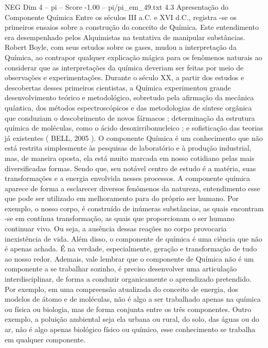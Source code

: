 \begin{textsample}{NEG Dim 4 – pi – Score -1.00 – pi/pi\_em\_49.txt}  \label{ex:f4_neg_166}
4.3 Apresentação do Componente Química Entre os séculos III a.C. e XVI d.C., registra -se os primeiros ensaios sobre a construção do conceito de Química.
Este entendimento era desempenhado pelos Alquimistas na tentativa de manipular substâncias.
Robert Boyle, com seus estudos sobre os gases, mudou a interpretação da Química, ao contrapor qualquer explicação mágica para os fenômenos naturais ao considerar que as interpretações da química deveriam ser feitas por meio de observações e experimentações.
Durante o século XX, a partir dos estudos e descobertas desses primeiros cientistas, a Química experimentou grande desenvolvimento teórico e metodológico, sobretudo pela afirmação da mecânica quântica, dos métodos espectroscópicos e das metodologias de síntese orgânica que conduziam o descobrimento de novos fármacos ; determinação da estrutura química de moléculas, como o ácido desoxirribonucleico ; e sofisticação das teorias já existentes ( BELL, 2005 ).
O componente Química é um conhecimento que não está restrita simplesmente às pesquisas de laboratório e à produção industrial, mas, de maneira oposta, ela está muito marcada em nosso cotidiano pelas mais diversificadas formas.
Sendo que, seu notável centro de estudo é a matéria, suas transformações e a energia envolvida nesses processos.
A componente química aparece de forma a esclarecer diversos fenômenos da natureza, entendimento esse que pode ser utilizado em melhoramento para do próprio ser humano.
Por exemplo, o nosso corpo, é construído de inúmeras substâncias, as quais encontram -se em contínua transformação, as quais que proporcionam o ser humano continuar vivo.
Ou seja, a ausência dessas reações no corpo provocaria inexistência de vida.
Além disso, o componente de química é uma ciência que não é apenas achada.
É na verdade, especialmente, geração e transformação de tudo ao nosso redor.
Ademais, vale lembrar que o componente de Química não é um componente a se trabalhar sozinho, é preciso desenvolver uma articulação interdisciplinar, de forma a conduzir organicamente o aprendizado pretendido.
Por exemplo, em uma compreensão atualizada do conceito de energia, dos modelos de átomo e de moléculas, não é algo a ser trabalhado apenas na química ou física ou biologia, mas de forma conjunta entre os três componentes.
Outro exemplo, a poluição ambiental seja ela urbana ou rural, do solo, das águas ou do ar, não é algo apenas biológico físico ou químico, esse conhecimento se trabalha em qualquer componente.

\end{textsample}
